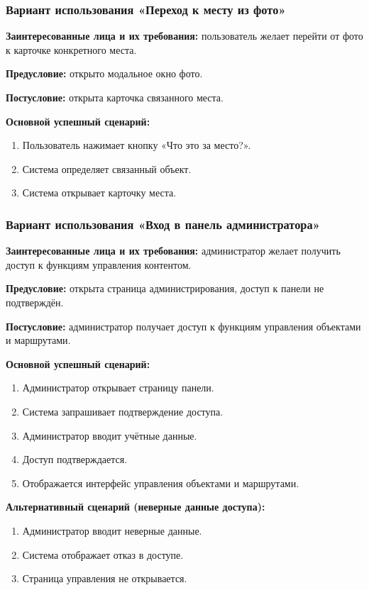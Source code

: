\subsubsection{Вариант использования «Переход к месту из фото»}
\textbf{Заинтересованные лица и их требования:} пользователь желает перейти от фото к карточке конкретного места.

\textbf{Предусловие:} открыто модальное окно фото.

\textbf{Постусловие:} открыта карточка связанного места.

\textbf{Основной успешный сценарий:}
\begin{enumerate}
	\item Пользователь нажимает кнопку «Что это за место?».
	\item Система определяет связанный объект.
	\item Система открывает карточку места.
\end{enumerate}

\subsubsection{Вариант использования «Вход в панель администратора»}
\textbf{Заинтересованные лица и их требования:} администратор желает получить доступ к функциям управления контентом.

\textbf{Предусловие:} открыта страница администрирования, доступ к панели не подтверждён.

\textbf{Постусловие:} администратор получает доступ к функциям управления объектами и маршрутами.

\textbf{Основной успешный сценарий:}
\begin{enumerate}
	\item Администратор открывает страницу панели.
	\item Система запрашивает подтверждение доступа.
	\item Администратор вводит учётные данные.
	\item Доступ подтверждается.
	\item Отображается интерфейс управления объектами и маршрутами.
\end{enumerate}

\textbf{Альтернативный сценарий (неверные данные доступа):} 
\begin{enumerate}
	\item Администратор вводит неверные данные.
	\item Система отображает отказ в доступе.
	\item Страница управления не открывается.
\end{enumerate}


